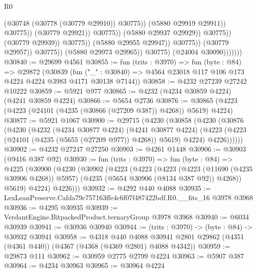 \begin{lexlean}{R0}
\begin{coremodule}
                                                          (@30748 (@30778 (@30779 @29910)) @30775))
                                                        (@5880 @29919 @29911))
                                                      @30775))
                                                  (@30779 @29921))
                                                @30775))
                                            (@5880 @29937 @29929))
                                          @30775))
                                      (@30779 @29939))
                                    @30775))
                                (@5880 @29955 @29947))
                              @30775))
                          (@30779 @29957))
                        @30775))
                    (@5880 @29973 @29965))
                  @30775)
                (@24004 @30090)))))))
@30840 := @29699 @4561
@30855 := fun (trits : @3970) =>
  fun (byte : @84) =>
  @29872
    (@30839
      (fun ("_" : @30840) => @4564 @23018 @117 @106 @173 @4224 @4224 @3983 @4171 @30138 @7144))
@30858 := @4232 @27239 @27242 @10222
@30859 := @5921 @977
@30865 := @4232 (@4234 @30859 @4224) (@4241 @30859 @4224)
@30866 := @5654 @2736
@30876 := @30865 (@4223 (@4223 (@24101 (@4235 (@30866 (@27209 @387)) @4268)) @5619) @4224)
@30877 := @5921 @1067
@30900 := @29715
    (@4230
      (@30858
        (@4230
          (@30876
            (@4230
              (@4232
                (@4234 @30877 @4224)
                (@4241 @30877 @4224)
                (@4223 (@4223 (@24101 (@4235 (@5655 (@27209 @977)) @4268)) @5619) @4224)
                @4226))))))
@30902 := @4232 @27247 @27250
@30903 := @4261 @1448
@30906 := @30903 (@9416 @387 @92)
@30930 := fun (trits : @3970) =>
  fun (byte : @84) =>
  @4225
    (@30900
      (@4230
        (@30902
          (@4223
            (@4223
              (@4223
                (@4223 (@11690 (@4235 @30906 @4268)) @5957)
                (@4235 (@5654 @30906 (@8134 @387 @92)) @4268))
              @5619)
            @4224)
          @4226)))
@30932 := @4292 @440 @4088
@30935 := LexLeanPreserve.Cafda79c757163ffe4c6f07f487422bdf.R0.__fits_16 @3978 @3968
@30936 := @4295 @30935
@30939 := VerdantEngine.BitpackedProduct.ternaryGroup @3978 @3968
@30940 := @6034 @30939
@30941 := @30936 @30940
@30944 := (trits : @3970) -> (byte : @84) -> @30932 @30941
@30958 := @4318
    @440
    @4088
    @30941
    @2801
    @29862
    (@4351 (@4361 @440))
    (@4367 (@4368 (@4369 @2801) @4088 @4342))
@30959 := @29873 @111
@30962 := @30959 @2775 @2799 @4224
@30963 := @5907 @387
@30964 := @4234 @30963
@30965 := @30964 @4224

\end{coremodule}
\end{lexlean}
